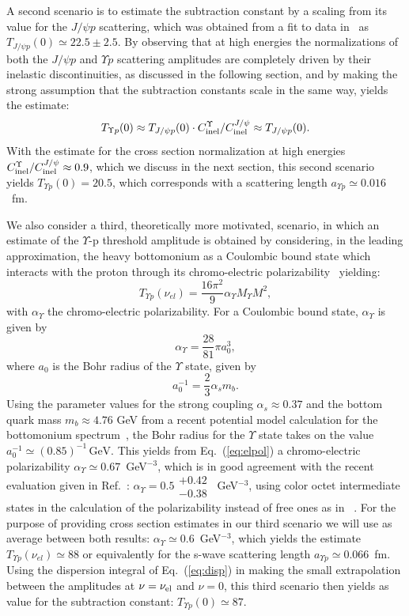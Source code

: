 \documentclass[prd,amsmath,%
twocolumn,floatfix,amssymb, preprintnumbers, nofootinbib, superscriptaddress]{revtex4}
\newcommand{\beq}{\begin{equation}}
\newcommand{\eeq}{\end{equation}}
\begin{document}
A second scenario is to estimate the subtraction constant by a scaling from its value for the $J/\psi p$ scattering, which was obtained from a fit to data in~\cite{Gryniuk:2016mpk} as $T_{J/\psi p }(0) \simeq 22.5 \pm 2.5$. 
By observing that at high energies the normalizations of both the $J/\psi p$ and $\Upsilon p$ scattering amplitudes are completely driven by their inelastic discontinuities, as discussed in the following section, and by making the strong assumption that the subtraction constants scale in the same way, yields the estimate: 
\beq
T_{\Upsilon p}(0) \approx T_{J/\psi p }(0) \cdot C_{\rm inel}^\Upsilon / C_{\rm inel}^{J/\psi} \approx T_{J/\psi p }(0).
\eeq
With the estimate for the cross section normalization 
at high energies  
$C_{\rm inel}^\Upsilon / C_{\rm inel}^{J/\psi} \approx 0.9$, which we discuss in the next section, this second scenario yields $T_{\Upsilon p}(0) = 20.5$, which corresponds with a scattering length $a_{\Upsilon p} \simeq 0.016$~fm. 

We also consider a third, theoretically more motivated, scenario, in which an estimate of the $\Upsilon$-p threshold amplitude is obtained by considering, in the leading approximation,  the heavy bottomonium 
as a Coulombic bound state which interacts with the proton through its chromo-electric polarizability~\cite{Peskin:1979va} yielding:
\beq
T_{\Upsilon p}(\nu_{el}) = \frac{16\pi^2}{9} \alpha_\Upsilon M_{\Upsilon} M^2,
\eeq
with $\alpha_\Upsilon$ the chromo-electric polarizability.  
For a Coulombic bound state, $\alpha_\Upsilon$ is given by~\cite{Peskin:1979va,Bhanot:1979vb}
\beq
\alpha_\Upsilon = \frac{28}{81} \pi a_0^3,
\label{eq:elpol}
\eeq
where $a_0$ is the Bohr radius of the $\Upsilon$ state, given by
\beq
a_0^{-1} = \frac{2}{3}\alpha_s m_b.
\eeq
Using the parameter values for the strong coupling $\alpha_s\approx 0.37$ and the bottom quark mass $m_b\approx 4.76$ GeV from a recent potential model calculation for the bottomonium spectrum~\cite{Deng:2016ktl}, the Bohr radius for the $\Upsilon$ state takes on the value
$a_0^{-1} \simeq (0.85)^{-1} \,\mathrm{GeV}$. 
This yields from Eq.~(\ref{eq:elpol}) a chromo-electric polarizability $\alpha_\Upsilon \simeq 0.67$~GeV$^{-3}$, which is in good agreement with the recent evaluation given in Ref.~\cite{Brambilla:2015rqa}: 
$\alpha_\Upsilon = 0.5 \substack{+0.42 \\ -0.38}$~GeV$^{-3}$, using color octet intermediate states in the calculation of the polarizability instead of free ones as in ~\cite{Peskin:1979va,Bhanot:1979vb}. For the purpose of providing cross section estimates in our third scenario we will use as average between both results: $\alpha_\Upsilon \simeq 0.6$~GeV$^{-3}$, 
which yields the estimate $T_{\Upsilon p}(\nu_{el}) \simeq 88$ or equivalently for the s-wave scattering length $a_{\Upsilon p} \simeq 0.066$~fm. Using the dispersion integral of Eq.~(\ref{eq:disp}) in making the small extrapolation between the amplitudes at $\nu = \nu_{\rm el}$ and $\nu = 0$, this third scenario then yields as value for the subtraction constant: $T_{\Upsilon p}(0) \simeq 87$. 
\end{document}
